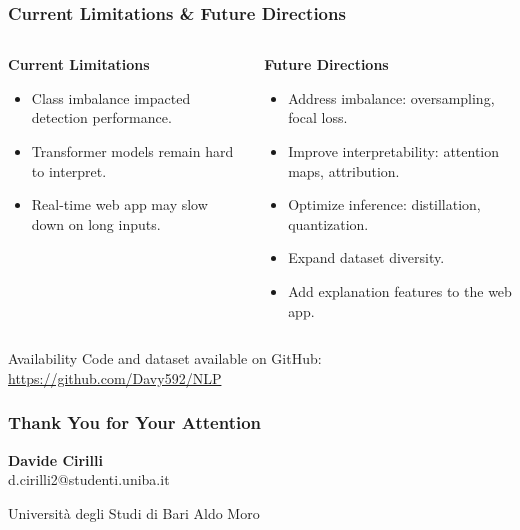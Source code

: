 \documentclass[aspectratio=169,xcolor=dvipsnames]{beamer}
\newcommand{\emoji}[1]{{\fluentemoji #1}}
\newcommand{\rocket}{\emoji{🚀}}
\begin{document}
\begin{frame}
\frametitle{Current Limitations \& Future Directions}

\begin{columns}[c]
\begin{column}{0.48\textwidth}
\textbf{Current Limitations}
\begin{itemize}
\item Class imbalance impacted detection performance.
\item Transformer models remain hard to interpret.
\item Real-time web app may slow down on long inputs.
\end{itemize}
\end{column}

\begin{column}{0.48\textwidth}
\textbf{Future Directions}
\begin{itemize}
\item Address imbalance: oversampling, focal loss.
\item Improve interpretability: attention maps, attribution.
\item Optimize inference: distillation, quantization.
\item Expand dataset diversity.
\item Add explanation features to the web app.
\end{itemize}
\end{column}
\end{columns}

\vspace{0.3cm}
\begin{block}{Availability}
Code and dataset available on GitHub: \\
\url{https://github.com/Davy592/NLP}
\end{block}

\end{frame}

\begin{frame}
\frametitle{Thank You for Your Attention\rocket}

\begin{center}

\vspace{1cm}
\Large{\textbf{Davide Cirilli}}\\
\normalsize{d.cirilli2@studenti.uniba.it}

\vspace{0.5cm}
\normalsize{Università degli Studi di Bari Aldo Moro}
\end{center}
\end{frame}

\end{document}
